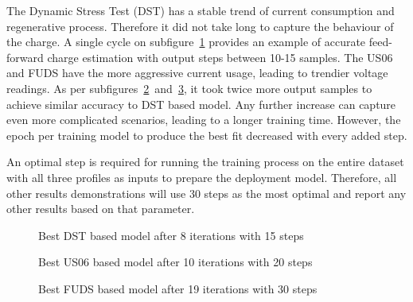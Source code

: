     The Dynamic Stress Test (DST) has a stable trend of current consumption and regenerative process.
    Therefore it did not take long to capture the behaviour of the charge.
    A single cycle on \mbox{subfigure~\ref{subfig:res_DST}} provides an example of accurate feed-forward charge estimation with output steps between 10-15 samples.
    The US06 and FUDS have the more aggressive current usage, leading to trendier voltage readings.
    As per \mbox{subfigures~\ref{subfig:res_US} and~\ref{subfig:res_FUDS}}, it took twice more output samples to achieve similar accuracy to DST based model.
    Any further increase can capture even more complicated scenarios, leading to a longer training time.
    However, the epoch per training model to produce the best fit decreased with every added step.
    
    An optimal step is required for running the training process on the entire dataset with all three profiles as inputs to prepare the deployment model.
    Therefore, all other results demonstrations will use 30 steps as the most optimal and report any other results based on that parameter.
    \begin{figure*}[htbp]
        \centering
        \begin{subfigure}[b]{0.325\textwidth}
            \centering
            
            \caption{Best DST based model after 8 iterations with 15 steps}
            \label{subfig:res_DST}
        \end{subfigure}
        \hfill
        \begin{subfigure}[b]{0.325\textwidth}
            \centering
            
            \caption{Best US06 based model after 10 iterations with 20 steps}
            \label{subfig:res_US}
        \end{subfigure}
        \hfill
        \begin{subfigure}[b]{0.325\textwidth}
            \centering
            
            \caption{Best FUDS based model after 19 iterations with 30 steps}
            \label{subfig:res_FUDS}
        \end{subfigure}
        \caption{Best training results over 3 different driving profiles}
        \label{fig:Models_res}
    \end{figure*}